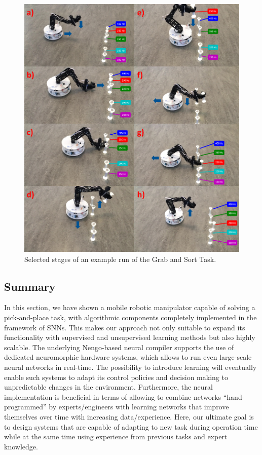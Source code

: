 \begin{figure}[t]
    \centering
    \includegraphics[width=0.8\linewidth]{imgs/omni_bot_example_run.png}
    \caption{Selected stages of an example run of the Grab and Sort Task.}
    \label{fig:omni_bot_example_run}
\end{figure}
\subsection{Summary}%
\label{subsec:summary_mobile_manipulation}

In this section, we have shown a mobile robotic manipulator capable of solving a pick-and-place task, with algorithmic components completely implemented in the framework of \aclp{SNN}. 
This makes our approach not only suitable to expand its functionality with supervised and unsupervised learning methods but also highly scalable. 
The underlying \ac{Nengo}-based neural compiler supports the use of dedicated neuromorphic hardware systems, which allows to run even large-scale neural networks in real-time. 
The possibility to introduce learning will eventually enable such systems to adapt its control policies and decision making to unpredictable changes in the environment. 
Furthermore, the neural implementation is beneficial in terms of allowing to combine networks “hand-programmed” by experts/engineers with learning networks that improve themselves over time with increasing data/experience. 
Here, our ultimate goal is to design systems that are capable of adapting to new task during operation time while at the same time using experience from previous tasks and expert knowledge.

